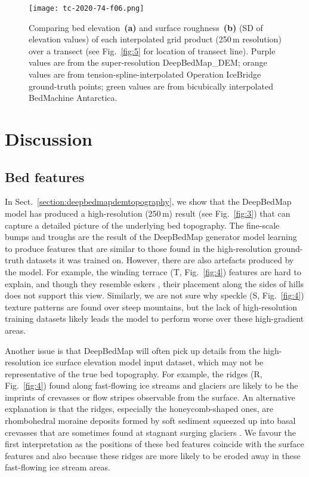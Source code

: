 \documentclass[tc, noline]{copernicus}
\begin{document}
\begin{figure}[t]
\texttt{[image: tc-2020-74-f06.png]}
\caption{Comparing bed elevation~\textbf{(a)} and surface roughness~\textbf{(b)} (SD of elevation values) of each interpolated grid product (250\,\unit{m} resolution) over a transect (see Fig.~\ref{fig:5} for location of transect line). Purple values are from the super-resolution DeepBedMap\_DEM; orange values are from tension-spline-interpolated Operation IceBridge ground-truth points; green values are from bicubically interpolated BedMachine Antarctica. }
\label{fig:6}
\end{figure}


\section{Discussion}

\subsection{Bed features}

In Sect.~\ref{section:deepbedmapdemtopography}, we show that the DeepBedMap model has produced a high-resolution (250\,\unit{m}) result (see
Fig.~\ref{fig:3}) that can capture a detailed picture of the underlying bed topography. The fine-scale bumps and troughs are the result of the
DeepBedMap generator model learning to produce features that are similar to those found in the high-resolution ground-truth datasets it was trained
on. However, there are also artefacts produced by the model. For example, the winding terrace (T, Fig.~\ref{fig:4}) features are hard to
explain, and though they resemble eskers \citep{DrewsActivelyevolvingsubglacial2017}, their placement along the sides of hills does not support this
view. Similarly, we are not sure why speckle (S, Fig.~\ref{fig:4}) texture patterns are found over steep mountains, but the lack of high-resolution training datasets likely leads the model to perform worse over these high-gradient areas.

Another issue is that DeepBedMap will often pick up details from the high-resolution ice surface elevation model
\citep{HowatReferenceElevationModel2019} input dataset, which may not be representative of the true bed topography. For example, the ridges
(R, Fig.~\ref{fig:4}) found along fast-flowing ice streams and glaciers are likely to be the imprints of crevasses or flow stripes
\citep{GlasserLongitudinalsurfacestructures2012} observable from the surface. An alternative explanation is that the ridges, especially the
honeycomb-shaped ones, are rhombohedral moraine deposits formed by soft sediment squeezed up into basal crevasses that are sometimes found at stagnant
surging glaciers
\citep{Dowdeswellvarietydistributionsubmarine2016,DowdeswellRhombohedralcrevassefillridges2016,SolheimSeafloormorphologyoutside1985}. We favour the
first interpretation as the positions of these bed features coincide with the surface features and also because these ridges are more likely to be
eroded away in these fast-flowing ice stream areas.
\end{document}
